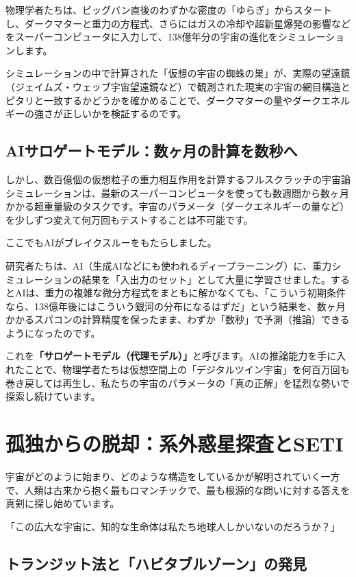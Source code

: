 物理学者たちは、ビッグバン直後のわずかな密度の「ゆらぎ」からスタートし、ダークマターと重力の方程式、さらにはガスの冷却や超新星爆発の影響などをスーパーコンピュータに入力して、138億年分の宇宙の進化をシミュレーションします。

シミュレーションの中で計算された「仮想の宇宙の蜘蛛の巣」が、実際の望遠鏡（ジェイムズ・ウェッブ宇宙望遠鏡など）で観測された現実の宇宙の網目構造とピタリと一致するかどうかを確かめることで、ダークマターの量やダークエネルギーの強さが正しいかを検証するのです。

\subsection{AIサロゲートモデル：数ヶ月の計算を数秒へ}

しかし、数百億個の仮想粒子の重力相互作用を計算するフルスクラッチの宇宙論シミュレーションは、最新のスーパーコンピュータを使っても数週間から数ヶ月かかる超重量級のタスクです。宇宙のパラメータ（ダークエネルギーの量など）を少しずつ変えて何万回もテストすることは不可能です。

ここでもAIがブレイクスルーをもたらしました。

研究者たちは、AI（生成AIなどにも使われるディープラーニング）に、重力シミュレーションの結果を「入出力のセット」として大量に学習させました。するとAIは、重力の複雑な微分方程式をまともに解かなくても、「こういう初期条件なら、138億年後にはこういう銀河の分布になるはずだ」という結果を、数ヶ月かかるスパコンの計算精度を保ったまま、わずか「数秒」で予測（推論）できるようになったのです。

これを\textbf{「サロゲートモデル（代理モデル）」}と呼びます。AIの推論能力を手に入れたことで、物理学者たちは仮想空間上の「デジタルツイン宇宙」を何百万回も巻き戻しては再生し、私たちの宇宙のパラメータの「真の正解」を猛烈な勢いで探索し続けています。

\section{孤独からの脱却：系外惑星探査とSETI}

宇宙がどのように始まり、どのような構造をしているかが解明されていく一方で、人類は古来から抱く最もロマンチックで、最も根源的な問いに対する答えを真剣に探し始めています。

「この広大な宇宙に、知的な生命体は私たち地球人しかいないのだろうか？」

\subsection{トランジット法と「ハビタブルゾーン」の発見}

